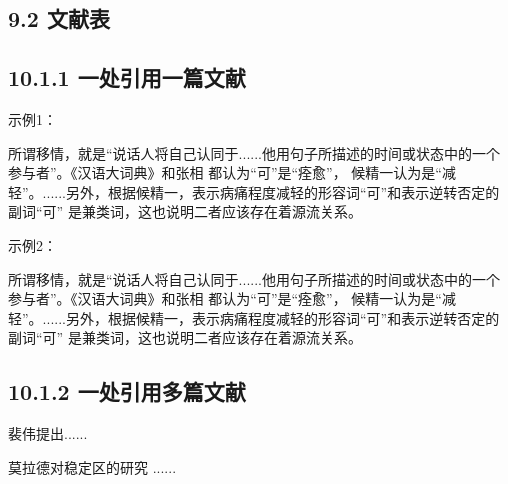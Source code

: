 \documentclass{article}
\begin{document}
\subsection*{9.2 文献表}
\begin{refsection}

\nocite{Baker1995--,Chernik1982--,尼葛洛庞帝1996--,汪冰1997-16-16,杨宗英1996-24-29,Dowler1995-5-26}

\printbibliography[heading=subbibliography,title={示例}]
\end{refsection}

\subsection*{10.1.1 一处引用一篇文献}

\begin{refsection}
示例1：

所谓移情，就是“说话人将自己认同于......他用句子所描述的时间或状态中的一个参与者”\cite{Sunstein1996-903-903}。《汉语大词典》和张相
\cite{Morri2010--}都认为“可”是“痊愈”，
候精一认为是“减轻”\cite{罗杰斯2011-15-16}。......另外，根据候精一，表示病痛程度减轻的形容词“可”和表示逆转否定的副词“可”
是兼类词\cite{陈登原2000-29-29}，这也说明二者应该存在着源流关系。

示例2：

所谓移情，就是“说话人将自己认同于......他用句子所描述的时间或状态中的一个参与者”。《汉语大词典》和张相
都认为“可”是“痊愈”，
候精一认为是“减轻”。......另外，根据候精一，表示病痛程度减轻的形容词“可”和表示逆转否定的副词“可”
是兼类词，这也说明二者应该存在着源流关系。


\end{refsection}

\subsection*{10.1.2 一处引用多篇文献}
\begin{refsection}

裴伟提出\cite{Humphrey1971--,CRANE1972--}......

莫拉德对稳定区的研究
\cite{CRANE1972--,Weinstein1974-745-772,KENNEDY1975-311-386}......


\end{refsection}


\newpage
\end{document}
